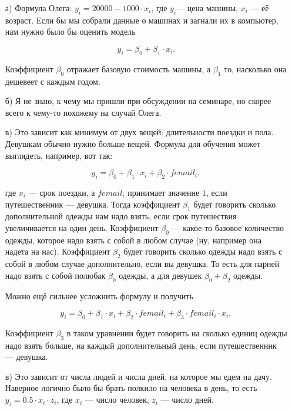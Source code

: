 \documentclass[12pt, a4paper, oneside]{article}
\theoremstyle{plain} %
\theoremstyle{definition}
\begin{document}
\begin{solution}
	\begin{enumerate}
		\item[а)]  Формула Олега: $y_i = 20000 - 1000 \cdot x_i$, где $y_i$--- цена машины, $x_i$ --- её возраст. Если бы мы собрали данные о машинах и загнали их в компьютер, нам нужно было бы оценить модель
		
		\[ y_i = \beta_0 + \beta_1 \cdot  x_i.\]
		
		Коэффициент $\beta_0$ отражает базовую стоимость машины, а $\beta_1$ то, насколько она дешевеет с каждым годом. 
		
		\item[б)]  Я не знаю, к чему мы пришли при обсуждении на семинаре, но скорее всего к чему-то похожему на случай Олега. 
		
		\item[в)]  Это зависит как минимум от двух вещей: длительности поездки и пола. Девушкам обычно нужно больше вещей. Формула для обучения может выглядеть, например, вот так: 
		
		\[ 
		y_i = \beta_0 + \beta_1 \cdot  x_i + \beta_2 \cdot femail_i,
		\]
		
		где $x_i$ --- срок поездки, а $femail_i$ принимает значение $1$, если путешественник --- девушка. Тогда коэффициент $\beta_1$ будет говорить сколько дополнительной одежды нам надо взять, если срок путешествия увеличивается на один день. Коэффициент $\beta_0$ --- какое-то базовое количество одежды, которое надо взять с собой в любом случае (ну, например она надета на нас). Коэффициент $\beta_2$ будет говорить сколько одежды надо взять с собой в любом случае дополнительно, если вы девушка. То есть для парней надо взять с собой полюбак $\beta_0$ одежды, а для девушек $\beta_0 + \beta_2$ одежды.
		
		Можно ещё сильнее усложнить формулу и получить 
		
		\[ 
		y_i = \beta_0 + \beta_1 \cdot  x_i + \beta_2 \cdot femail_i + \beta_3 \cdot femail_i \cdot x_i,
		\]		
		
		Коэффициент $\beta_3$ в таком уравнении будет говорить на сколько единиц одежды надо взять больше, на каждый дополнительный день, если путешественник --- девушка. 
		
		\item[в)]   Это зависит от числа людей и числа дней, на которое мы едем на дачу. Наверное логично было бы брать полкило на человека в день, то есть $y_i = 0.5 \cdot x_i \cdot z_i$, где $x_i$ --- число человек, $z_i$ --- число дней. 
		

\end{enumerate}
\end{solution}
\end{document}
